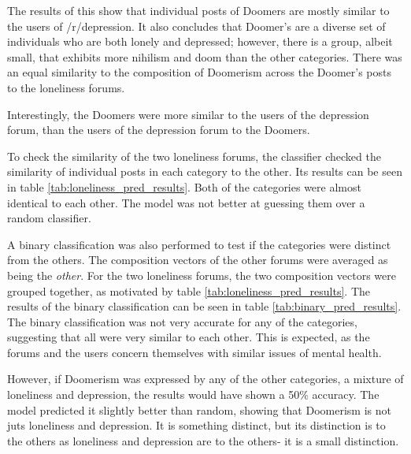 \documentclass[../report.tex]{subfiles}
\begin{document}
The results of this show that individual posts of Doomers are mostly similar to the users of /r/depression. 
It also concludes that Doomer's are a diverse set of individuals who are both lonely and depressed; however, there is a group, albeit small, that exhibits more nihilism and doom than the other categories.
There was an equal similarity to the composition of Doomerism across the Doomer's posts to the loneliness forums.

Interestingly, the Doomers were more similar to the users of the depression forum, than the users of the depression forum to the Doomers. 

To check the similarity of the two loneliness forums, the classifier checked the similarity of individual posts in each category to the other. 
Its results can be seen in table \ref{tab:loneliness_pred_results}.
Both of the categories were almost identical to each other. 
The model was not better at guessing them over a random classifier.

A binary classification was also performed to test if the categories were distinct from the others.
The composition vectors of the other forums were averaged as being the \textit{other}.
For the two loneliness forums, the two composition vectors were grouped together, as motivated by table \ref{tab:loneliness_pred_results}.
The results of the binary classification can be seen in table \ref{tab:binary_pred_results}.
The binary classification was not very accurate for any of the categories, suggesting that all were very similar to each other. 
This is expected, as the forums and the users concern themselves with similar issues of mental health.

However, if Doomerism was expressed by any of the other categories, a mixture of loneliness and depression, the results would have shown a 50\% accuracy. 
The model predicted it slightly better than random, showing that Doomerism is not juts loneliness and depression.
It is something distinct, but its distinction is to the others as loneliness and depression are to the others\-- it is a small distinction.



	
\end{document}
